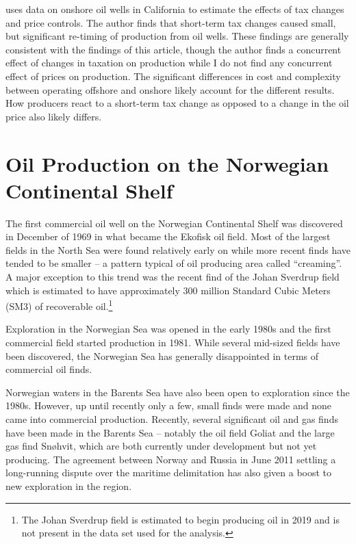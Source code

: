 \documentclass[12pt]{article}
\begin{document}
\citet{rao_taxation_2010} uses data on onshore oil wells in California to estimate the effects of tax changes and price controls. The author finds that short-term tax changes caused small, but significant re-timing of production from oil wells.  These findings are generally consistent with the findings of this article, though the author finds a concurrent effect of changes in taxation on production while I do not find any concurrent effect of prices on production. The significant differences in cost and complexity between operating offshore and onshore likely account for the different results.  How producers react to a short-term tax change as opposed to a change in the oil price also likely differs.

\section{Oil Production on the Norwegian Continental Shelf}

The first commercial oil well on the Norwegian Continental Shelf was discovered in December of 1969 in what became the Ekofisk oil field. Most of the largest fields in the North Sea were found relatively early on while more recent finds have tended to be smaller -- a pattern typical of oil producing area called ``creaming''. A major exception to this trend was the recent find of the Johan Sverdrup field which is estimated to have approximately 300 million Standard Cubic Meters (SM3) of recoverable oil.\footnote{The Johan Sverdrup field is estimated to begin producing oil in 2019 and is not present in the data set used for the analysis.}

Exploration in the Norwegian Sea was opened in the early 1980s and the first commercial field started production in 1981.  While several mid-sized fields have been discovered, the Norwegian Sea has generally disappointed in terms of commercial oil finds.  

Norwegian waters in the Barents Sea have also been open to exploration since the 1980s. However, up until recently only a few, small finds were made and none came into commercial production.  Recently, several significant oil and gas finds have been made in the Barents Sea -- notably the oil field Goliat and the large gas find Sn\o hvit, which are both currently under development but not yet producing.  The agreement between Norway and Russia in June 2011 settling a long-running dispute over the maritime delimitation has also given a boost to new exploration in the region.  
\end{document}
